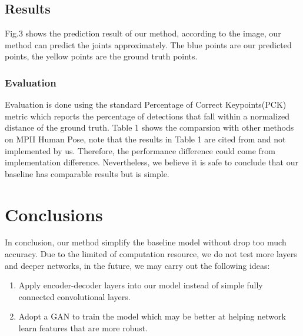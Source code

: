 \documentclass[final]{cvpr}
\begin{document}
\subsection{Results}
Fig.3 shows the prediction result of our method, according to the image, our method can predict the joints approximately. The blue points are our predicted points, the yellow points are the ground truth points.
\subsubsection{Evaluation}
Evaluation is done using the standard Percentage of Correct Keypoints(PCK) metric which reports the percentage of detections that fall within a normalized distance of the ground truth. Table 1 shows the  comparsion with other methods on MPII Human Pose, note that the results in Table 1 are cited from \cite{newell2016stacked} and not implemented by us. Therefore, the performance difference could come from implementation difference. Nevertheless, we believe it is safe to conclude that our baseline has comparable results but is simple.
\section{Conclusions}
In conclusion, our method simplify the baseline model without drop too much accuracy. Due to the limited of computation resource, we do not test more layers and deeper networks, in the future, we may carry out the following ideas:
\begin{enumerate}
\item Apply encoder-decoder layers into our model instead of simple fully connected convolutional layers.
\item Adopt a GAN to train the model which may be better at helping network learn features that are more robust. 
\end{enumerate}




\end{document}

